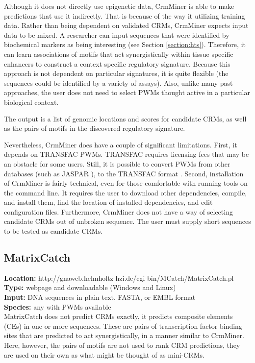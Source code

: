 \documentclass{frontiersENG} %
\begin{document}
Although it does not directly use epigenetic data, CrmMiner is able to
make predictions that use it indirectly. That is because of the way it
utilizing training data. Rather than being dependent on validated
CRMs, CrmMiner expects input data to be mixed. A researcher can input
sequences that were identified by biochemical markers as being
interesting (see Section \ref{section:hts}). Therefore, it can
learn associations of motifs that act synergistically within tissue
specific enhancers to construct a context specific regulatory
signature. Because this approach is not dependent on particular
signatures, it is quite flexible (the sequences could be identified by
a variety of assays). Also, unlike many past approaches, the user does
not need to select PWMs thought active in a particular biological
context.

The output is a list of genomic locations and scores for candidate
CRMs, as well as the pairs of motifs in the discovered regulatory
signature.

Nevertheless, CrmMiner does have a couple of significant
limitations. First, it depends on TRANSFAC PWMs. TRANSFAC requires
licensing fees that may be an obstacle for some users. Still,
it is possible to convert PWMs from other databases (such as JASPAR
\cite{Mathelier2014}), to the TRANSFAC format
\cite{Thomas-Chollier2008}. Second, installation of CrmMiner is fairly
technical, even for those comfortable with running tools on the
command line. It requires the user to download other dependencies,
compile, and install them, find the location of installed
dependencies, and edit configuration files. Furthermore, CrmMiner does
not have a way of selecting candidate CRMs out of unbroken
sequence. The user must supply short sequences to be tested as
candidate CRMs.

\subsection{MatrixCatch}
\noindent
\textbf{Location:} http://gnaweb.helmholtz-hzi.de/cgi-bin/MCatch/MatrixCatch.pl \\
\textbf{Type:} webpage and downloadable (Windows and Linux) \\
\textbf{Input:} DNA sequences in plain text, FASTA, or EMBL format\\
\textbf{Species:} any with PWMs available \\

MatrixCatch \cite{Deyneko2013} does not predict CRMs exactly, it
predicts composite elements (CEs) in one or more sequences. These are
pairs of transcription factor binding sites that are predicted to act
synergistically, in a manner similar to CrmMiner. Here, however, the
pairs of motifs are not used to rank CRM predictions, they are used on
their own as what might be thought of as mini-CRMs.
\end{document}
